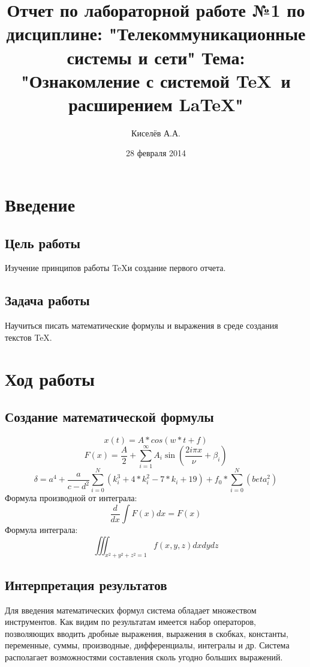 \documentclass[10pt,a4paper]{report}
\author{Киселёв А.А.}
\title{Отчет по лабораторной работе №1 по дисциплине: "Телекоммуникационные системы и сети"\newline
Тема: "Ознакомление с системой \TeX\ и расширением \LaTeX "}
\date{28 февраля 2014}
\begin{document}
\maketitle
\pagebreak
\chapter{Введение}
\section{Цель работы}
Изучение принципов работы \TeX и создание первого отчета.
\section{Задача работы}
Научиться писать математические формулы и выражения в среде создания текстов \TeX.
\chapter{Ход работы}
\section{Создание математической формулы}
\begin{displaymath}
x(t) = A * cos(w*t+f)
\end{displaymath}
\begin{displaymath}
F(x) = \frac{A}{2} + \sum \limits_{i=1}^{\infty} A_i \sin \left( \frac{2 i \pi x}{\nu} + \beta_i \right)
\end{displaymath}
\begin{displaymath}
\delta = a^4 + \frac{a}{c-d^2} \sum_{i=0}^{N}(k _i^3+4*k_i^2-7*k_i+19) + f_0 *  \sum_{i=0}^{N}(beta_i^2)
\end{displaymath}
Формула производной от интеграла:
\begin{displaymath}
\frac{d}{dx}\int F(x) dx=F(x)
\end{displaymath}
Формула интеграла:
\begin{displaymath}
\iiint_{x^2 + y^2 + z^2 = 1} f(x, y, z) dx dy dz 
\end{displaymath}
\section{Интерпретация результатов}
Для введения математических формул система обладает множеством инструментов. Как видим по результатам имеется набор операторов, позволяющих вводить дробные выражения, выражения в скобках, константы, переменные, суммы, производные, дифференциалы, интегралы и др. 
Система располагает возможностями составления сколь угодно больших выражений.
\end{document}
